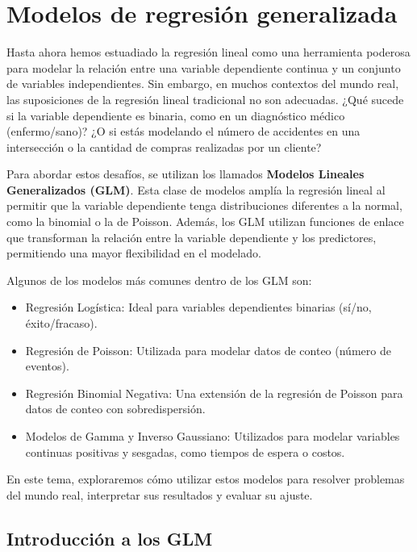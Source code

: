 \documentclass[
  letterpaper,
  DIV=11,
  numbers=noendperiod]{scrreprt}
\providecommand{\tightlist}{%
  \setlength{\itemsep}{0pt}\setlength{\parskip}{0pt}}
\begin{document}

\chapter{Modelos de regresión generalizada}\label{sec-tema4}

Hasta ahora hemos estuadiado la regresión lineal como una herramienta
poderosa para modelar la relación entre una variable dependiente
continua y un conjunto de variables independientes. Sin embargo, en
muchos contextos del mundo real, las suposiciones de la regresión lineal
tradicional no son adecuadas. ¿Qué sucede si la variable dependiente es
binaria, como en un diagnóstico médico (enfermo/sano)? ¿O si estás
modelando el número de accidentes en una intersección o la cantidad de
compras realizadas por un cliente?

Para abordar estos desafíos, se utilizan los llamados \textbf{Modelos
Lineales Generalizados (GLM)}. Esta clase de modelos amplía la regresión
lineal al permitir que la variable dependiente tenga distribuciones
diferentes a la normal, como la binomial o la de Poisson. Además, los
GLM utilizan funciones de enlace que transforman la relación entre la
variable dependiente y los predictores, permitiendo una mayor
flexibilidad en el modelado.

Algunos de los modelos más comunes dentro de los GLM son:

\begin{itemize}
\tightlist
\item
  Regresión Logística: Ideal para variables dependientes binarias
  (sí/no, éxito/fracaso).
\item
  Regresión de Poisson: Utilizada para modelar datos de conteo (número
  de eventos).
\item
  Regresión Binomial Negativa: Una extensión de la regresión de Poisson
  para datos de conteo con sobredispersión.
\item
  Modelos de Gamma y Inverso Gaussiano: Utilizados para modelar
  variables continuas positivas y sesgadas, como tiempos de espera o
  costos.
\end{itemize}

En este tema, exploraremos cómo utilizar estos modelos para resolver
problemas del mundo real, interpretar sus resultados y evaluar su
ajuste.

\section{Introducción a los GLM}\label{introducciuxf3n-a-los-glm}
\end{document}
